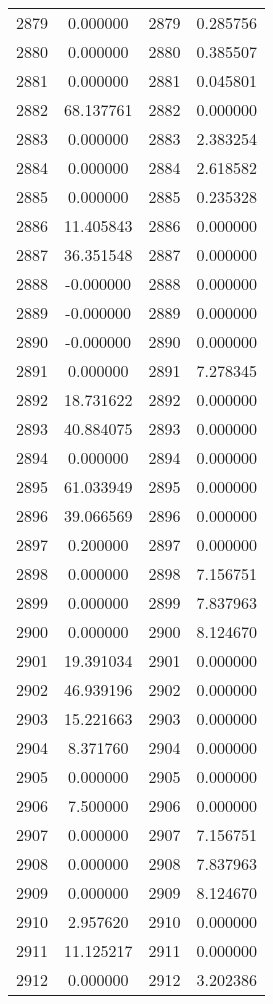 \documentclass[12pt]{article}
\begin{document}
\begin{longtable}{@{}cccc@{}}
2879 & 0.000000 & 2879 & 0.285756 \\
2880 & 0.000000 & 2880 & 0.385507 \\
2881 & 0.000000 & 2881 & 0.045801 \\
2882 & 68.137761 & 2882 & 0.000000 \\
2883 & 0.000000 & 2883 & 2.383254 \\
2884 & 0.000000 & 2884 & 2.618582 \\
2885 & 0.000000 & 2885 & 0.235328 \\
2886 & 11.405843 & 2886 & 0.000000 \\
2887 & 36.351548 & 2887 & 0.000000 \\
2888 & -0.000000 & 2888 & 0.000000 \\
2889 & -0.000000 & 2889 & 0.000000 \\
2890 & -0.000000 & 2890 & 0.000000 \\
2891 & 0.000000 & 2891 & 7.278345 \\
2892 & 18.731622 & 2892 & 0.000000 \\
2893 & 40.884075 & 2893 & 0.000000 \\
2894 & 0.000000 & 2894 & 0.000000 \\
2895 & 61.033949 & 2895 & 0.000000 \\
2896 & 39.066569 & 2896 & 0.000000 \\
2897 & 0.200000 & 2897 & 0.000000 \\
2898 & 0.000000 & 2898 & 7.156751 \\
2899 & 0.000000 & 2899 & 7.837963 \\
2900 & 0.000000 & 2900 & 8.124670 \\
2901 & 19.391034 & 2901 & 0.000000 \\
2902 & 46.939196 & 2902 & 0.000000 \\
2903 & 15.221663 & 2903 & 0.000000 \\
2904 & 8.371760 & 2904 & 0.000000 \\
2905 & 0.000000 & 2905 & 0.000000 \\
2906 & 7.500000 & 2906 & 0.000000 \\
2907 & 0.000000 & 2907 & 7.156751 \\
2908 & 0.000000 & 2908 & 7.837963 \\
2909 & 0.000000 & 2909 & 8.124670 \\
2910 & 2.957620 & 2910 & 0.000000 \\
2911 & 11.125217 & 2911 & 0.000000 \\
2912 & 0.000000 & 2912 & 3.202386 \\

\end{longtable}
\end{document}
